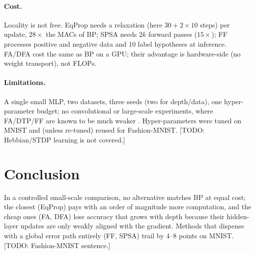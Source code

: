 \documentclass[11pt]{article}
\newcommand{\todo}[1]{{\color{red}[TODO: #1]}}
\begin{document}
\paragraph{Cost.} Locality is not free. EqProp needs a relaxation (here $30+2\times10$ steps) per update, $28\times$ the MACs of BP; SPSA needs $2k$ forward passes ($15\times$); FF processes positive and negative data and $10$ label hypotheses at inference. FA/DFA cost the same as BP on a GPU; their advantage is hardware-side (no weight transport), not FLOPs.
\paragraph{Limitations.} A single small MLP, two datasets, three seeds (two for depth/data), one hyper-parameter budget; no convolutional or large-scale experiments, where FA/DTP/FF are known to be much weaker \cite{bartunov2018,xiao2018,launay2020}. Hyper-parameters were tuned on MNIST and (unless re-tuned) reused for Fashion-MNIST. \todo{Hebbian/STDP learning is not covered.}

\section{Conclusion}
In a controlled small-scale comparison, no alternative matches BP at equal cost; the closest (EqProp) pays with an order of magnitude more computation, and the cheap ones (FA, DFA) lose accuracy that grows with depth because their hidden-layer updates are only weakly aligned with the gradient. Methods that dispense with a global error path entirely (FF, SPSA) trail by 4--8 points on MNIST. \todo{Fashion-MNIST sentence.}



\end{document}
